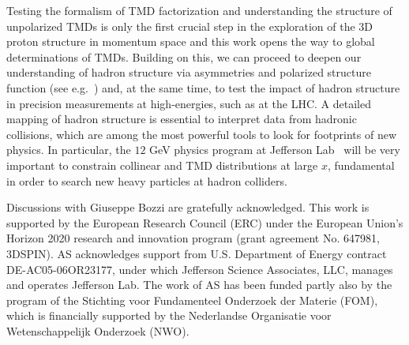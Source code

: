 \documentclass[aps,preprintnumbers,showpacs,nofootinbib,superscriptaddress,floatfix]{revtex4}
\begin{document}
Testing the formalism of TMD factorization and understanding the structure of unpolarized TMDs is only the first crucial step in the exploration of the 3D proton structure in momentum space and this work opens the way to global determinations of TMDs. 
Building on this, we can proceed to deepen our understanding of hadron structure via asymmetries and polarized structure function (see e.g.~\cite{Aschenauer:2015ndk,Boglione:2015zyc,Kikola:2017hnp}) and, at the same time, to test the impact of hadron structure in precision measurements at high-energies, such as at the LHC. A detailed mapping of hadron structure is essential to interpret data from hadronic collisions, which are among the most powerful tools to look for footprints of new physics.
In particular, the $12$ GeV physics program at Jefferson Lab~\cite{Dudek:2012vr} will be very important to constrain collinear and TMD distributions at large $x$, fundamental in order to search new heavy particles at hadron colliders.





\begin{acknowledgments}
Discussions with Giuseppe Bozzi are gratefully acknowledged.
This work is supported by the European Research Council (ERC) under the European Union's Horizon 2020 research and innovation program (grant agreement No. 647981, 3DSPIN). 
AS acknowledges support from U.S. Department of Energy contract DE-AC05-06OR23177, under which Jefferson Science Associates, LLC, manages and operates Jefferson Lab. 
The work of AS has been funded partly also by the program of the Stichting voor Fundamenteel Onderzoek der Materie (FOM), which is financially supported by the Nederlandse Organisatie voor Wetenschappelijk Onderzoek (NWO).
\end{acknowledgments}
%
%

%

%
%
\end{document}
